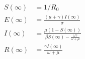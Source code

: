 \begin{align*}

S(\infty) &= 1/R_0

\\

E(\infty) &= \frac{(\mu+\gamma)I(\infty)}{\sigma}

\\

I(\infty) &= \frac{\mu (1-S(\infty))}{\beta S(\infty) -\frac{\omega\gamma}{\omega+\mu}}

\\

R(\infty) &= \frac{\gamma I(\infty)}{\omega + \mu}

\end{align*}
